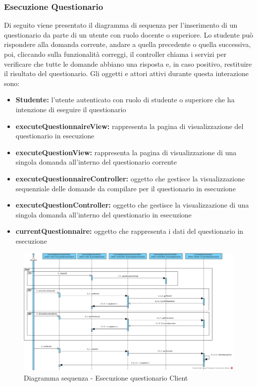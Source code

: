 \documentclass[12pt,a4paper]{article}
\begin{document}
\newpage
\subsubsection{Esecuzione Questionario}
Di seguito viene presentato il diagramma di sequenza per l'inserimento di un questionario da parte di un utente con ruolo docente o superiore. Lo studente può rispondere alla domanda corrente, andare a quella precedente o quella successiva, poi, cliccando sulla funzionalità correggi, il controller chiama i servizi per verificare che tutte le domande abbiano una risposta e, in caso positivo, restituire il risultato del questionario. Gli oggetti e attori attivi durante questa interazione sono:

\begin{itemize}
	\item \textbf{Studente:}	 l'utente autenticato con ruolo di studente o superiore che ha intenzione di eseguire il questionario
	\item \textbf{executeQuestionnaireView:} rappresenta la pagina di visualizzazione del questionario in esecuzione
	\item \textbf{executeQuestionView:} rappresenta la pagina di visualizzazione di una singola domanda all'interno del questionario corrente
	\item \textbf{executeQuestionnaireController:} oggetto che gestisce la visualizzazione sequenziale delle domande da compilare per il questionario in esecuzione
	\item \textbf{executeQuestionController:} oggetto che gestisce la visualizzazione di una singola domanda all'interno del questionario in esecuzione
	\item \textbf{currentQuestionnaire:} oggetto che rappresenta i dati del questionario in esecuzione
\end{itemize}

\begin{center}
	\begin{figure}[H]
		\centering \includegraphics[max width=\myheight, angle=90]{../img/diagrammiSequenza/executeQuestionnaireClient.png}
		\caption{Diagramma sequenza - Esecuzione questionario Client}
	\end{figure}
\end{center}
\end{document}

